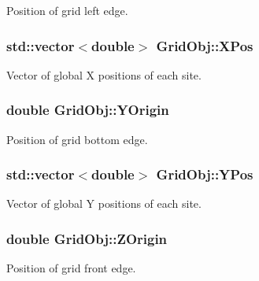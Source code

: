 Position of grid left edge. 

\subsubsection[{\texorpdfstring{X\+Pos}{XPos}}]{\setlength{\rightskip}{0pt plus 5cm}std\+::vector$<$double$>$ Grid\+Obj\+::\+X\+Pos}\hypertarget{class_grid_obj_af31df133bf9419da6222a0dbb4e54bab}{}\label{class_grid_obj_af31df133bf9419da6222a0dbb4e54bab}


Vector of global X positions of each site. 

\subsubsection[{\texorpdfstring{Y\+Origin}{YOrigin}}]{\setlength{\rightskip}{0pt plus 5cm}double Grid\+Obj\+::\+Y\+Origin}\hypertarget{class_grid_obj_a30c070fe26def1366db2b3e66b3cd29d}{}\label{class_grid_obj_a30c070fe26def1366db2b3e66b3cd29d}


Position of grid bottom edge. 

\subsubsection[{\texorpdfstring{Y\+Pos}{YPos}}]{\setlength{\rightskip}{0pt plus 5cm}std\+::vector$<$double$>$ Grid\+Obj\+::\+Y\+Pos}\hypertarget{class_grid_obj_a2bd4e9b575377b8e76e5ebe7a3a31194}{}\label{class_grid_obj_a2bd4e9b575377b8e76e5ebe7a3a31194}


Vector of global Y positions of each site. 

\subsubsection[{\texorpdfstring{Z\+Origin}{ZOrigin}}]{\setlength{\rightskip}{0pt plus 5cm}double Grid\+Obj\+::\+Z\+Origin}\hypertarget{class_grid_obj_a69d43fd31ba7edd4fc9f02eb0c0fcefd}{}\label{class_grid_obj_a69d43fd31ba7edd4fc9f02eb0c0fcefd}


Position of grid front edge. 


